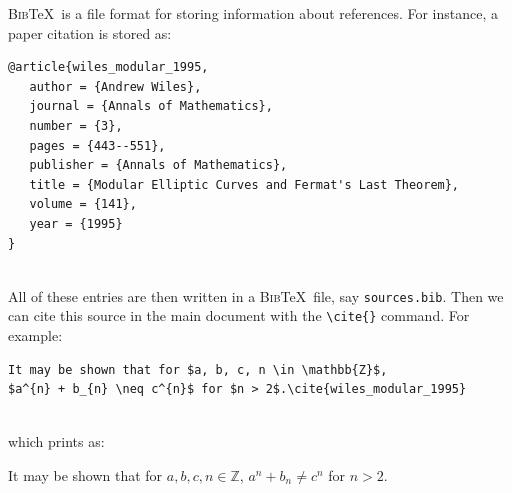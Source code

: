 \textsc{Bib}\TeX\ is a file format for storing information about references.
For instance, a paper citation is stored as:\\
\begin{minipage}{0.75\textwidth}
\small
  \vspace{2mm}
  \begin{verbatim}
@article{wiles_modular_1995,
   author = {Andrew Wiles},
   journal = {Annals of Mathematics},
   number = {3},
   pages = {443--551},
   publisher = {Annals of Mathematics},
   title = {Modular Elliptic Curves and Fermat's Last Theorem},
   volume = {141},
   year = {1995}
}
  \end{verbatim}
\end{minipage}\\
All of these entries are then written in a \textsc{Bib}\TeX\ file, say \texttt{sources.bib}.
Then we can cite this source in the main document with the \verb|\cite{}| command. 
For example:

\noindent
\begin{minipage}{0.45\textwidth}
\small
  \vspace{4mm}
  \begin{verbatim}
It may be shown that for $a, b, c, n \in \mathbb{Z}$,
$a^{n} + b_{n} \neq c^{n}$ for $n > 2$.\cite{wiles_modular_1995}
  \end{verbatim}
\end{minipage}\\
which prints as: \\
\begin{minipage}{0.45\textwidth}
It may be shown that for $a, b, c, n \in \mathbb{Z}$, $a^{n} + b_{n} \neq c^{n}$ for $n > 2$.\cite{wiles_modular_1995}
\end{minipage}

